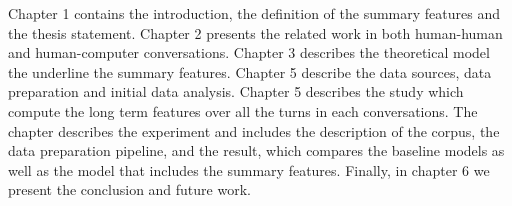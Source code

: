 Chapter 1 contains the introduction, the definition of the summary features and the thesis statement. Chapter 2 presents the related work in both human-human and human-computer conversations. Chapter 3 describes the theoretical model the underline the summary features. Chapter 5 describe the data sources, data preparation and initial data analysis. Chapter 5 describes the study which compute the long term features over all the turns in each conversations. The chapter describes the experiment and includes the description of the corpus, the data preparation pipeline, and the result, which compares the baseline models as well as the model that includes the summary features. Finally, in chapter 6 we present the conclusion and future work.
